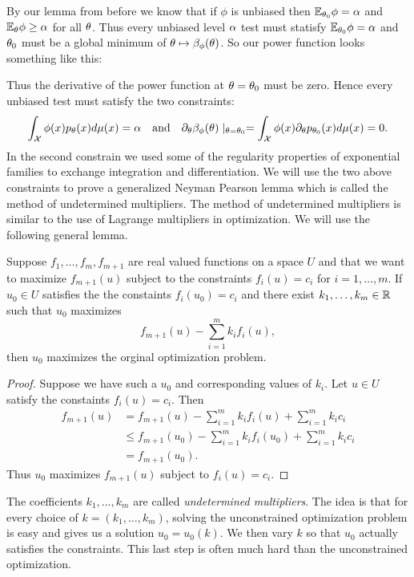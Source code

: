 By our lemma from before we know that if $\phi$ is unbiased then ${\mathbb{E}}_{{\theta}_0}\phi = {\alpha}$ and ${\mathbb{E}}_{\theta} \phi \ge {\alpha}$ for all ${\theta}$. Thus every unbiased level ${\alpha}$ test must statisfy ${\mathbb{E}}_{{\theta}_0}\phi={\alpha}$ and ${\theta}_0$ must be a global minimum of ${\theta} \mapsto \beta_\phi({\theta})$. So our power function looks something like this:
\begin{center}
    
\end{center}


Thus the derivative of the power function at ${\theta}={\theta}_0$ must be zero. Hence every unbiased test must satisfy the two constraints:
\begin{equation}
    \int_{\mathcal{X}} \phi(x) p_{\theta}(x)d\mu(x) = {\alpha} ~~~\text{and}~~~ \partial_{\theta} \beta_\phi({\theta})\mid_{{\theta} = {\theta}_0} = \int_{\mathcal{X}} \phi(x) \partial_{\theta} p_{{\theta}_0}(x)d\mu(x) =0.
\end{equation}
In the second constrain we used some of the regularity properties of exponential families to exchange integration and differentiation. We will use the two above constraints to prove a generalized Neyman Pearson lemma which is called the method of undetermined multipliers. The method of undetermined multipliers is similar to the use of Lagrange multipliers in optimization. We will use the following general lemma.
\begin{lemma}
    Suppose $f_1,\ldots,f_m,f_{m+1}$ are real valued functions on a space $U$ and that we want to maximize $f_{m+1}(u)$ subject to the constraints $f_i(u)=c_i$ for $i=1,\ldots,m$. If $u_0 \in U$ satisfies the the constaints $f_i(u_0)=c_i$ and there exist $k_1,\ldots,k_m \in {\mathbb R}$ such that $u_0$ maximizes
    \[f_{m+1}(u)-\sum_{i=1}^m k_if_i(u),\]
    then $u_0$ maximizes the orginal optimization problem.
\end{lemma}
 
\begin{proof}
    Suppose we have such a $u_0$ and corresponding values of $k_i$. Let $u \in U$ satisfy the constaints $f_i(u)=c_i$. Then
    \begin{align*}
        f_{m+1}(u) &= f_{m+1}(u)-\sum_{i=1}^m k_i f_i(u) + \sum_{i=1}^m k_ic_i\\
        &\le f_{m+1}(u_0)-\sum_{i=1}^m k_i f_i(u_0) + \sum_{i=1}^m k_ic_i\\
        &= f_{m+1}(u_0).
    \end{align*}
    Thus $u_0$ maximizes $f_{m+1}(u)$ subject to $f_i(u)=c_i$.
\end{proof}
The coefficients $k_1,\ldots, k_m$ are called \emph{undetermined multipliers}. The idea is that for every choice of $k=(k_1,\ldots,k_m)$, solving the unconstrained optimization problem is easy and gives us a solution $u_0 = u_0(k)$. We then vary $k$ so that $u_0$ actually satisfies the constraints. This last step is often much hard than the unconstrained optimization. 
